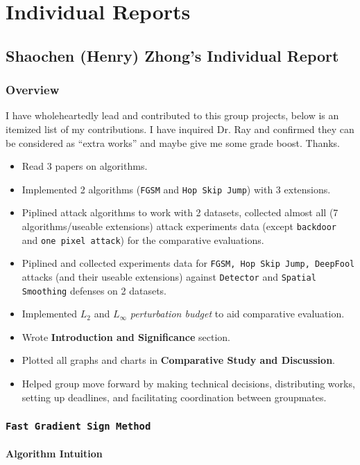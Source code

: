 \documentclass[11pt]{article}
\newcommand{\ilc}{\texttt}
\begin{document}
\section{Individual Reports}

\subsection{Shaochen (Henry) Zhong's Individual Report}
\subsubsection{Overview}

I have wholeheartedly lead and contributed to this group projects, below is an itemized list of my contributions. I have inquired Dr. Ray and confirmed they can be considered as ``extra works'' and maybe give me some grade boost. Thanks.
\begin{itemize}
    \item Read 3 papers on algorithms.
    \item Implemented 2 algorithms (\ilc{FGSM} and \ilc{Hop Skip Jump}) with 3 extensions.
    \item Piplined attack algorithms to work with 2 datasets, collected almost all (7 algorithms/useable extensions) attack experiments data (except \ilc{backdoor} and \ilc{one pixel attack}) for the comparative evaluations.
    \item Piplined and collected experiments data for \ilc{FGSM, Hop Skip Jump, DeepFool} attacks (and their useable extensions) against \ilc{Detector} and \ilc{Spatial Smoothing} defenses on 2 datasets.
    \item Implemented $L_2$ and $L_{\infty}$ \textit{perturbation budget} to aid comparative evaluation.
    \item Wrote \textbf{Introduction and Significance} section.
    \item Plotted all graphs and charts in \textbf{Comparative Study and Discussion}.
    \item Helped group move forward by making technical decisions, distributing works, setting up deadlines, and facilitating coordination between groupmates.
\end{itemize}

\subsubsection{\ilc{Fast Gradient Sign Method}}
\paragraph{Algorithm Intuition}
\end{document}
